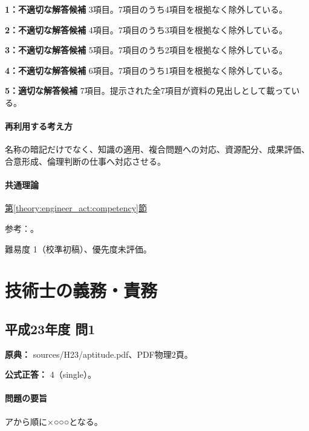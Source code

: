 \noindent\textbf{1：不適切な解答候補} 3項目。7項目のうち4項目を根拠なく除外している。\par

\noindent\textbf{2：不適切な解答候補} 4項目。7項目のうち3項目を根拠なく除外している。\par

\noindent\textbf{3：不適切な解答候補} 5項目。7項目のうち2項目を根拠なく除外している。\par

\noindent\textbf{4：不適切な解答候補} 6項目。7項目のうち1項目を根拠なく除外している。\par

\noindent\textbf{5：適切な解答候補} 7項目。提示された全7項目が資料の見出しとして載っている。\par

\paragraph{再利用する考え方} 名称の暗記だけでなく、知識の適用、複合問題への対応、資源配分、成果評価、合意形成、倫理判断の仕事へ対応させる。

\paragraph{共通理論} \hyperref[theory:engineer_act:competency]{第\ref*{theory:engineer_act:competency}節}

\par 参考：\cite{mext_competency2014}。

\par 難易度 1（校準初稿）、優先度未評価。

\section{技術士の義務・責務}

\subsection{平成23年度 問1}
\label{q:h23-reg-apt-01}

\noindent\textbf{原典：} sources/H23/aptitude.pdf、PDF物理2頁。

\textbf{公式正答：} 4（single）。

\paragraph{問題の要旨} アから順に×○○○となる。

